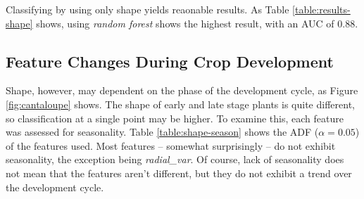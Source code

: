 \documentclass[letterpaper, notitlepage]{report}
\begin{document}
Classifying by using only shape yields reaonable results. As Table \ref{table:results-shape} shows, using \textit{random forest} shows the highest result, with an AUC of 0.88. 

{
\renewcommand{\arraystretch}{0.9}

}

\subsection{Feature Changes During Crop Development}
Shape, however, may dependent on the phase of the development cycle, as Figure \ref{fig:cantaloupe} shows. The shape of early and late stage plants is quite different, so classification at a single point may be higher.  To examine this, each feature was assessed for seasonality. Table \ref{table:shape-season} shows the ADF ($\alpha = 0.05$) of the features used.  Most features -- somewhat surprisingly -- do not exhibit seasonality, the exception being \textit{radial\_var}. Of course, lack of seasonality does not mean that the features aren't different, but they do not exhibit a trend over the development cycle.

{
\renewcommand{\arraystretch}{0.9}

}
\end{document}
